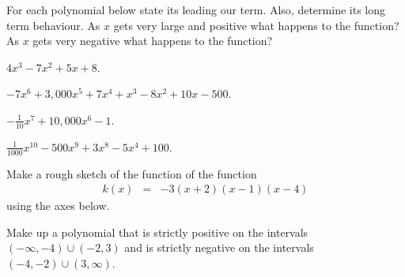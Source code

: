 \begin{problem}
\item For each polynomial below state its leading our term.  Also,
  determine its long term behaviour. As $x$ gets very large and
  positive what happens to the function? As $x$ gets very negative
  what happens to the function?
  \begin{subproblem}
  \item ${\displaystyle 4x^3 - 7x^2 + 5x + 8 }$.
    \vfill
  \item ${\displaystyle -7 x^6 + 3,000 x^5 + 7x^4 + x^3 - 8x^2 + 10x - 500}$.
    \vfill
  \item ${\displaystyle - \frac{1}{10} x^7 + 10,000 x^6 - 1 }$.
    \vfill
  \item ${\displaystyle \frac{1}{1000} x^{10} - 500 x^9 + 3 x^8 - 5 x^4 + 100 }$.
    \vfill
  \end{subproblem}

  \clearpage

\item Make a rough sketch of the function of the function
  \begin{eqnarray*}
    k(x) & = & -3(x+2)(x-1)(x-4)
  \end{eqnarray*}
  using the axes below.


  \vfill

  \clearpage
  
\item Make up a polynomial that is strictly positive on the intervals
  $(-\infty,-4)\cup(-2,3)$
  and is strictly negative on the intervals
  $(-4,-2)\cup(3,\infty)$.


\end{problem}
